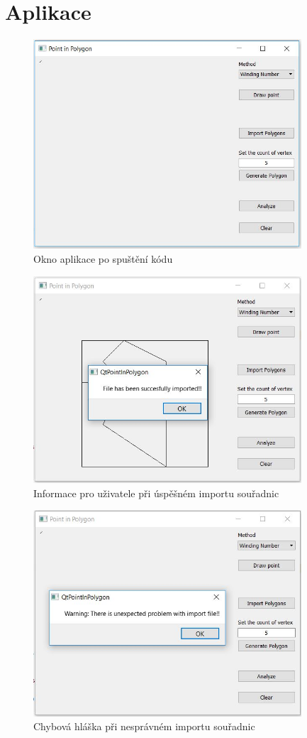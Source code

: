 \documentclass[a4paper, 12pt]{article}
\begin{document}
\clearpage
\section{Aplikace}

\begin{figure}[h!]
	\centering
	\includegraphics[width=10cm]{okno.jpg}
	\caption{Okno aplikace po spuštění kódu}
\end{figure}

\begin{figure}[h!]
	\centering
	\includegraphics[width=10cm]{import_ok.jpg}
	\caption{Informace pro uživatele při úspěšném importu souřadnic}
\end{figure}

\begin{figure}[h!]
	\centering
	\includegraphics[width=10cm]{import_error.jpg}
	\caption{Chybová hláška při nesprávném importu souřadnic}
\end{figure}
\end{document}
